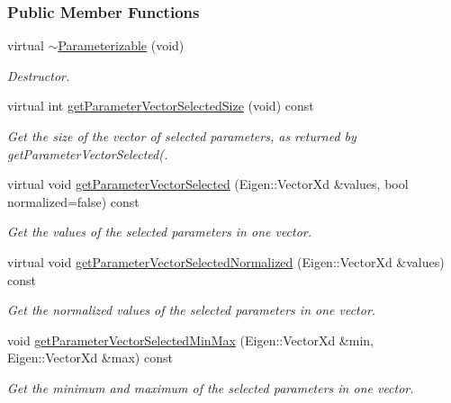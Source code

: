 \subsubsection*{Public Member Functions}
\begin{DoxyCompactItemize}
\item 
\hypertarget{classDmpBbo_1_1Parameterizable_a96e10bcc1ff83dbdf8ad313145f5bf8c}{virtual \hyperlink{classDmpBbo_1_1Parameterizable_a96e10bcc1ff83dbdf8ad313145f5bf8c}{$\sim$\+Parameterizable} (void)}\label{classDmpBbo_1_1Parameterizable_a96e10bcc1ff83dbdf8ad313145f5bf8c}

\begin{DoxyCompactList}\small\item\em Destructor. \end{DoxyCompactList}\item 
virtual int \hyperlink{classDmpBbo_1_1Parameterizable_ae83cb950bcf5219841e6ca8511ac2907}{get\+Parameter\+Vector\+Selected\+Size} (void) const 
\begin{DoxyCompactList}\small\item\em Get the size of the vector of selected parameters, as returned by get\+Parameter\+Vector\+Selected(. \end{DoxyCompactList}\item 
virtual void \hyperlink{classDmpBbo_1_1Parameterizable_aab955bec57f074a991b8be31d6ce54ca}{get\+Parameter\+Vector\+Selected} (Eigen\+::\+Vector\+Xd \&values, bool normalized=false) const 
\begin{DoxyCompactList}\small\item\em Get the values of the selected parameters in one vector. \end{DoxyCompactList}\item 
virtual void \hyperlink{classDmpBbo_1_1Parameterizable_acd774ea7a9d4d2539ec194fe4e67ff29}{get\+Parameter\+Vector\+Selected\+Normalized} (Eigen\+::\+Vector\+Xd \&values) const 
\begin{DoxyCompactList}\small\item\em Get the normalized values of the selected parameters in one vector. \end{DoxyCompactList}\item 
void \hyperlink{classDmpBbo_1_1Parameterizable_a83d42bcdb0962117720b028baecbfbcf}{get\+Parameter\+Vector\+Selected\+Min\+Max} (Eigen\+::\+Vector\+Xd \&min, Eigen\+::\+Vector\+Xd \&max) const 
\begin{DoxyCompactList}\small\item\em Get the minimum and maximum of the selected parameters in one vector. \end{DoxyCompactList}\item 

\end{DoxyCompactItemize}
